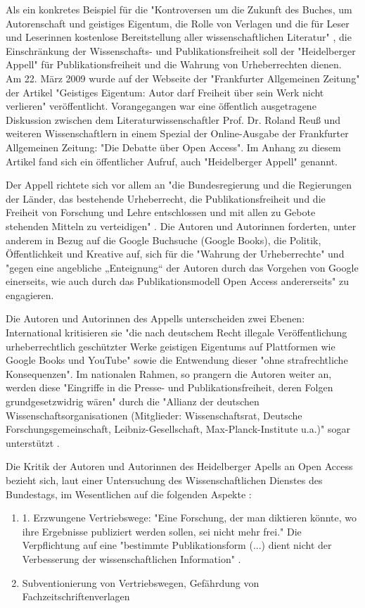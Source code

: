 Als ein konkretes Beispiel für die "Kontroversen um die Zukunft des Buches, um Autorenschaft und geistiges Eigentum, die Rolle von Verlagen und die für Leser und Leserinnen kostenlose Bereitstellung aller wissenschaftlichen Literatur" \cite{Hagner_2015}, die Einschränkung der Wissenschafts- und Publikationsfreiheit soll der "Heidelberger Appell" für Publikationsfreiheit und die Wahrung von Urheberrechten dienen. Am 22. März 2009 wurde auf der Webseite der "Frankfurter Allgemeinen Zeitung" der Artikel "Geistiges Eigentum: Autor darf Freiheit über sein Werk nicht verlieren" \cite{Heidelberger_Appell_2009} veröffentlicht. Vorangegangen war eine öffentlich ausgetragene Diskussion zwischen dem Literaturwissenschaftler Prof. Dr. Roland Reuß und weiteren Wissenschaftlern in einem Spezial der Online-Ausgabe der Frankfurter Allgemeinen Zeitung: "Die Debatte über Open Access". Im Anhang zu diesem Artikel fand sich ein öffentlicher Aufruf, auch "Heidelberger Appell" genannt.

Der Appell richtete sich vor allem an "die Bundesregierung und die Regierungen der Länder, das bestehende Urheberrecht, die Publikationsfreiheit und die Freiheit von Forschung und Lehre entschlossen und mit allen zu Gebote stehenden Mitteln zu verteidigen" \cite{ITK_2009}. Die Autoren und Autorinnen forderten, unter anderem in Bezug auf die Google Buchsuche (Google Books), die Politik, Öffentlichkeit und Kreative auf, sich für die "Wahrung der Urheberrechte" und "gegen eine angebliche „Enteignung“ der Autoren durch das Vorgehen von Google einerseits, wie auch durch das Publikationsmodell Open Access andererseits" \cite{Cloes_2009} zu engagieren.

Die Autoren und Autorinnen des Appells unterscheiden zwei Ebenen: International kritisieren sie "die nach deutschem Recht illegale Veröffentlichung urheberrechtlich geschützter Werke geistigen Eigentums auf Plattformen wie Google Books und YouTube" sowie die Entwendung dieser "ohne strafrechtliche Konsequenzen". Im nationalen Rahmen, so prangern die Autoren weiter an, werden diese "Eingriffe in die Presse- und Publikationsfreiheit, deren Folgen grundgesetzwidrig wären" durch die "Allianz der deutschen Wissenschaftsorganisationen (Mitglieder: Wissenschaftsrat, Deutsche Forschungsgemeinschaft, Leibniz-Gesellschaft, Max-Planck-Institute u.a.)" sogar unterstützt \cite{ITK_2009}.

Die Kritik der Autoren und Autorinnen des Heidelberger Apells an Open Access bezieht sich, laut einer Untersuchung des Wissenschaftlichen Dienstes des Bundestags, im Wesentlichen auf die folgenden Aspekte \cite{Cloes_2009}:
\begin{enumerate}
\item 1.	Erzwungene Vertriebswege: "Eine Forschung, der man diktieren könnte, wo ihre Ergebnisse publiziert werden sollen, sei nicht mehr frei." Die Verpflichtung auf eine "bestimmte Publikationsform (...) dient nicht der Verbesserung der wissenschaftlichen Information" \cite{ITK_2009}.
\item Subventionierung von Vertriebswegen, Gefährdung von Fachzeitschriftenverlagen \cite{ITK_2009}
\end{enumerate}

